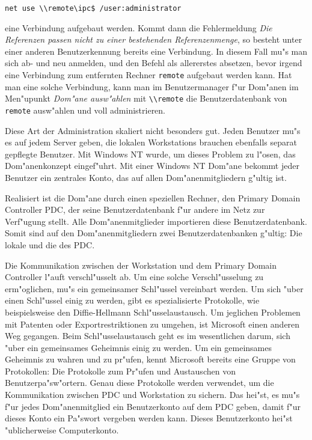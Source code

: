 \documentclass{scrartcl}\usepackage{pslatex}\typearea{12}
\newcommand{\nbname}{\texttt}
\begin{document}
\begin{verbatim}
net use \\remote\ipc$ /user:administrator
\end{verbatim}

eine Verbindung aufgebaut werden. Kommt dann die Fehlermeldung
\emph{Die Referenzen passen nicht zu einer bestehenden
  Referenzenmenge}, so besteht unter einer anderen Benutzerkennung
bereits eine Verbindung. In diesem Fall mu"s man sich ab- und neu
anmelden, und den Befehl als allererstes absetzen, bevor irgend eine
Verbindung zum entfernten Rechner \nbname{remote} aufgebaut werden
kann. Hat man eine solche Verbindung, kann man im Benutzermanager f"ur
Dom"anen im Men"upunkt \emph{Dom"ane ausw"ahlen} mit
\nbname{\textbackslash{}\textbackslash{}remote} die Benutzerdatenbank
von \nbname{remote} ausw"ahlen und voll administrieren.

Diese Art der Administration skaliert nicht besonders gut. Jeden
Benutzer mu"s es auf jedem Server geben, die lokalen Workstations
brauchen ebenfalls separat gepflegte Benutzer. Mit Windows NT wurde,
um dieses Problem zu l"osen, das Dom"anenkonzept eingef"uhrt. Mit
einer Windows NT Dom"ane bekommt jeder Benutzer ein zentrales Konto,
das auf allen Dom"anenmitgliedern g"ultig ist.

Realisiert ist die Dom"ane durch einen speziellen Rechner, den Primary
Domain Controller PDC, der seine Benutzerdatenbank f"ur andere im Netz
zur Verf"ugung stellt. Alle Dom"anenmitglieder importieren diese
Benutzerdatenbank. Somit sind auf den Dom"anenmitgliedern zwei
Benutzerdatenbanken g"ultig: Die lokale und die des PDC.

Die Kommunikation zwischen der Workstation und dem Primary Domain
Controller l"auft verschl"usselt ab. Um eine solche Verschl"usselung
zu erm"oglichen, mu"s ein gemeinsamer Schl"ussel vereinbart werden. Um
sich "uber einen Schl"ussel einig zu werden, gibt es spezialisierte
Protokolle, wie beispielsweise den Diffie-Hellmann
Schl"usselaustausch. Um jeglichen Problemen mit Patenten oder
Exportrestriktionen zu umgehen, ist Microsoft einen anderen Weg
gegangen.  Beim Schl"usselaustausch geht es im wesentlichen darum,
sich "uber ein gemeinsames Geheimnis einig zu werden. Um ein
gemeinsames Geheimnis zu wahren und zu pr"ufen, kennt Microsoft
bereits eine Gruppe von Protokollen: Die Protokolle zum Pr"ufen und
Austauschen von Benutzerpa"sw"ortern. Genau diese Protokolle werden
verwendet, um die Kommunikation zwischen PDC und Workstation zu
sichern. Das hei"st, es mu"s f"ur jedes Dom"anenmitglied ein
Benutzerkonto auf dem PDC geben, damit f"ur dieses Konto ein Pa"swort
vergeben werden kann. Dieses Benutzerkonto hei"st "ublicherweise
Computerkonto.
\end{document}
